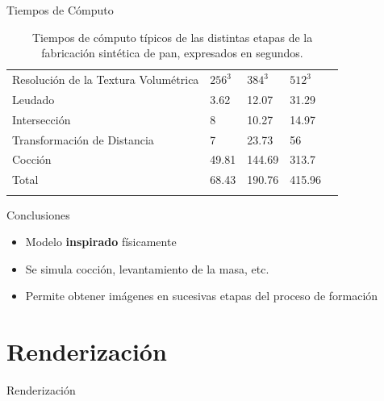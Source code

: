 \documentclass[spanish,unknownkeysallowed]{beamer}
\begin{document}
\begin{frame}{Tiempos de Cómputo}

\begin{table}[h!]
\begin{tabular}{lllll}
\hline\noalign{\smallskip}
Resolución de la Textura Volumétrica & $256^{3}$ & $384^{3}$  & $512^{3}$ \\
\noalign{\smallskip}\hline\noalign{\smallskip}
Leudado & 3.62 & 12.07 & 31.29 \\
Intersección & 8 & 10.27 & 14.97 \\
Transformación de Distancia & 7 & 23.73 & 56 \\
Cocción  & 49.81 & 144.69 & 313.7 \\
\hline\noalign{\smallskip}
Total & 68.43 & 190.76 & 415.96 \\
\noalign{\smallskip}\hline
\end{tabular}
\caption{Tiempos de cómputo típicos de las distintas etapas de la fabricación sintética de pan, expresados en segundos.}
\label{tab:computingtimes}
\end{table}
\end{frame}

\begin{frame}{Conclusiones}
\begin{block}{}
\begin{itemize}
\item Modelo \textbf{inspirado} físicamente
\item Se simula cocción, levantamiento de la masa, etc.
\item Permite obtener imágenes en sucesivas etapas del proceso de formación
\end{itemize}
\end{block}
\end{frame}

\section{Renderización}


\begin{frame}
\begin{block}{}
\begin{center}
\vspace{1cm}
\huge{Renderización}
\vspace{1cm}
\end{center}
\end{block}
\end{frame}
\end{document}
